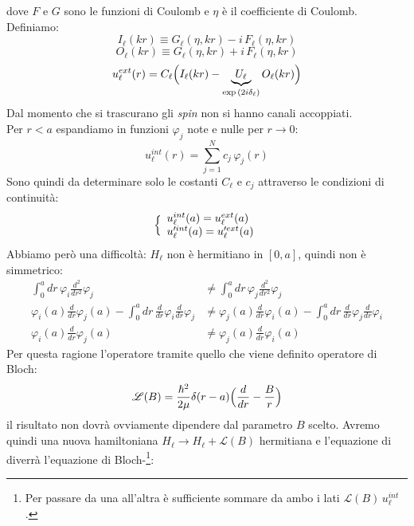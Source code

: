 dove $F$ e $G$ sono le funzioni di Coulomb e $\eta$ è il coefficiente di Coulomb. Definiamo:
$$ I_\ell (kr) \equiv G_\ell (\eta,kr) - i\, F_\ell(\eta,kr) $$
$$ O_\ell (kr) \equiv G_\ell (\eta,kr) + i\, F_\ell(\eta,kr) $$
\begin{equation}\label{0412_uext}
u_\ell^{ext} (r) = C_\ell \Bigl ( I_\ell(kr) - \underbrace{U_\ell}_{\exp{(2i\delta_\ell)}}O_\ell(kr) \Bigr )
\end{equation}
Dal momento che si trascurano gli \textit{spin} non si hanno canali accoppiati.\\ 
Per $r<a$ espandiamo in funzioni $\varphi_j$ note e nulle per $r\to0$: %
\begin{equation}\label{0412_uint}
u_\ell^{int} (r) = \sum_{j=1}^N c_j \,\varphi_j(r)
\end{equation}
Sono quindi da determinare solo le costanti $C_\ell$ e $c_j$ attraverso le condizioni di continuità:
\begin{equation}\label{0412_cont}
\Bigl \{
\begin{array}{l}
u_\ell^{int}(a) = u_\ell^{ext}(a)\\ 
u_\ell'^{int}(a) = u_\ell'^{ext}(a)	
\end{array}
\end{equation}
Abbiamo però una difficoltà: $H_\ell$ non è hermitiano in $[0,a]$, quindi non è simmetrico:
\begin{displaymath}
	\begin{aligned}
	\int_0^a dr\, \varphi_i \frac{d^2}{dr^2} \varphi_j &\not = \int_0^a dr\, \varphi_j \frac{d^2}{dr^2} \varphi_j \\ 
	\varphi_i (a) \frac{d}{dr}\varphi_j(a)-\int_0^a dr\,\frac{d}{dr}\varphi_i \frac{d}{dr}\varphi_j &\not = \varphi_j (a) \frac{d}{dr}\varphi_i (a) - \int_0^a dr\,\frac{d}{dr}\varphi_j \frac{d}{dr}\varphi_i  \\
	\varphi_i (a) \frac{d}{dr}\varphi_j(a) &\not = \varphi_j (a) \frac{d}{dr}\varphi_i (a) 
	\end{aligned}
\end{displaymath}
Per questa ragione  l'operatore tramite quello che viene definito operatore di Bloch:
\begin{equation}\label{0412_bloch}
\mathscr{L}(B) = \frac{\hbar^2}{2\mu}\delta(r-a) \Bigl ( \frac{d}{dr}-\frac{B}{r} \Bigr )
\end{equation}
il risultato non dovrà ovviamente dipendere dal parametro $B$ scelto. Avremo quindi una nuova hamiltoniana $H_\ell \to H_\ell + \mathscr{L}(B)$ hermitiana e l'equazione di \Sch{} diverrà l'equazione di Bloch-\Sch{}\footnote{Per passare da una all'altra è sufficiente sommare da ambo i lati $\mathscr{L}(B)\, u_\ell^{int}$.}:

